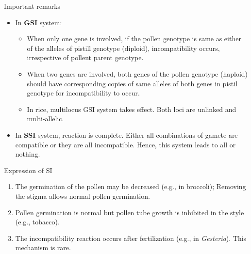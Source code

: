 \documentclass[11pt,ignorenonframetext,aspectratio=169]{beamer}
\providecommand{\tightlist}{%
  \setlength{\itemsep}{0pt}\setlength{\parskip}{0pt}}
\begin{document}
\begin{frame}{}
\protect\hypertarget{section-7}{}
\begin{block}{Important remarks}
\protect\hypertarget{important-remarks}{}
\begin{itemize}
\tightlist
\item
  In \textbf{GSI} system:

  \begin{itemize}
  \tightlist
  \item
    When only one gene is involved, if the pollen genotype is same as
    either of the alleles of pistill genotype (diploid), incompatibility
    occurs, irrespective of pollent parent genotype.
  \item
    When two genes are involved, both genes of the pollen genotype
    (haploid) should have corresponding copies of same alleles of both
    genes in pistil genotype for incompatibility to occur.
  \item
    In rice, multilocus GSI system takes effect. Both loci are unlinked
    and multi-allelic.
  \end{itemize}
\item
  In \textbf{SSI} system, reaction is complete. Either all combinations
  of gamete are compatible or they are all incompatible. Hence, this
  system leads to all or nothing.
\end{itemize}
\end{block}
\end{frame}

\begin{frame}{Expression of SI}
\protect\hypertarget{expression-of-si}{}
\begin{enumerate}
\tightlist
\item
  The germination of the pollen may be decreased (e.g., in broccoli);
  Removing the stigma allows normal pollen germination.
\item
  Pollen germination is normal but pollen tube growth is inhibited in
  the style (e.g., tobacco).
\item
  The incompatibility reaction occurs after fertilization (e.g., in
  \emph{Gesteria}). This mechanism is rare.
\end{enumerate}
\end{frame}
\end{document}
